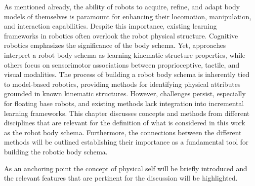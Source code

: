 
As mentioned already, the ability of robots to acquire, refine, and adapt body models of themselves is paramount for enhancing their locomotion, manipulation, and interaction capabilities. Despite this importance, existing learning frameworks in robotics often overlook the robot physical structure. Cognitive robotics emphasizes the significance of the body schema. Yet, approaches interpret a robot body schema as learning kinematic structure properties, while others focus on sensorimotor associations between proprioceptive, tactile, and visual modalities. The process of building a robot body schema is inherently tied to model-based robotics, providing methods for identifying physical attributes grounded in known kinematic structures. However, challenges persist, especially for floating base robots, and existing methods lack integration into incremental learning frameworks. This chapter discusses concepts and methods from different disciplines that are relevant for the definition of what is considered in this work as the robot body schema. Furthermore, the connections between the different methods will be outlined establishing their importance as a fundamental tool for building the robotic body schema. 


As an anchoring point the concept of physical self will be briefly introduced and the relevant features that are pertinent for the discussion will be highlighted. 



